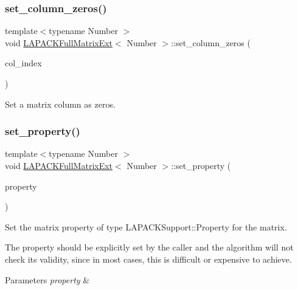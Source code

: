 \subsubsection{\texorpdfstring{set\+\_\+column\+\_\+zeros()}{set\_column\_zeros()}}
{\footnotesize\ttfamily template$<$typename Number $>$ \\
void \hyperlink{classLAPACKFullMatrixExt}{L\+A\+P\+A\+C\+K\+Full\+Matrix\+Ext}$<$ Number $>$\+::set\+\_\+column\+\_\+zeros (\begin{DoxyParamCaption}\item[{const \hyperlink{classLAPACKFullMatrixExt_a5cf5f4a6104dc17029210b5ca52bf574}{size\+\_\+type}}]{col\+\_\+index }\end{DoxyParamCaption})}

Set a matrix column as zeros. \mbox{\label{classLAPACKFullMatrixExt_a604d19d69393d88430293b48aad71a3b}} 
\subsubsection{\texorpdfstring{set\+\_\+property()}{set\_property()}}
{\footnotesize\ttfamily template$<$typename Number $>$ \\
void \hyperlink{classLAPACKFullMatrixExt}{L\+A\+P\+A\+C\+K\+Full\+Matrix\+Ext}$<$ Number $>$\+::set\+\_\+property (\begin{DoxyParamCaption}\item[{const L\+A\+P\+A\+C\+K\+Support\+::\+Property}]{property }\end{DoxyParamCaption})}

Set the matrix property of type {\ttfamily L\+A\+P\+A\+C\+K\+Support\+::\+Property} for the matrix.


\begin{DoxyDescription}
\item[Comment ]The property should be explicitly set by the caller and the algorithm will not check its validity, since in most cases, this is difficult or expensive to achieve. 
\end{DoxyDescription}


\begin{DoxyParams}{Parameters}
{\em property} & \\
\hline
\end{DoxyParams}


